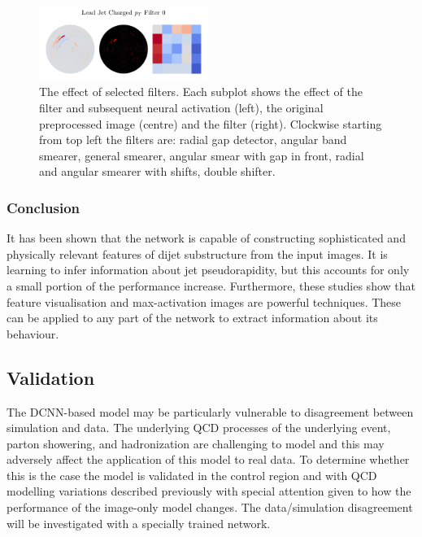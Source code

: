 \begin{figure}[h!]
\begin{center}
        \includegraphics[width=0.49\textwidth]{figures/event_selection/ggh_firstconv_0_0.pdf}
    \end{center}
    \caption{The effect of selected filters. Each subplot shows the effect of the filter and subsequent neural activation (left), the original preprocessed image (centre) and the filter (right).
             Clockwise starting from top left the filters are: radial gap detector, angular band smearer, general smearer, angular smear with gap in front, radial and angular smearer with shifts, double shifter.}
    \label{fig:event_categorisation:filter_action}
\end{figure}



\subsubsection{Conclusion}
It has been shown that the network is capable of constructing sophisticated and physically relevant features of dijet substructure from the input images. 
It is learning to infer information about jet pseudorapidity, but this accounts for only a small portion of the performance increase. 
Furthermore, these studies show that feature visualisation and max-activation images are powerful techniques. 
These can be applied to any part of the network to extract information about its behaviour.  











\subsection{Validation}
The DCNN-based model may be particularly vulnerable to disagreement between simulation and data. The underlying QCD processes of the underlying event, parton showering, and hadronization are challenging to model and this may adversely affect the application of this model to real data. To determine whether this is the case the model is validated in the \Zee control region and with QCD modelling variations described previously with special attention given to how the performance of the image-only model changes.
The \Zee data/simulation disagreement will be investigated with a specially trained network. 

